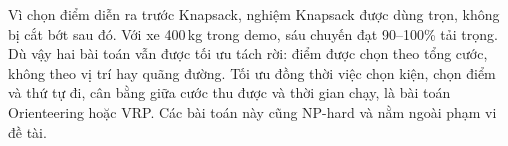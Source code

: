 Vì chọn điểm diễn ra trước Knapsack, nghiệm Knapsack được dùng trọn, không bị cắt bớt sau đó. Với xe 400\,kg trong demo, sáu chuyến đạt 90--100\% tải trọng. Dù vậy hai bài toán vẫn được tối ưu tách rời: điểm được chọn theo tổng cước, không theo vị trí hay quãng đường. Tối ưu đồng thời việc chọn kiện, chọn điểm và thứ tự đi, cân bằng giữa cước thu được và thời gian chạy, là bài toán Orienteering hoặc VRP. Các bài toán này cũng NP-hard và nằm ngoài phạm vi đề tài.
